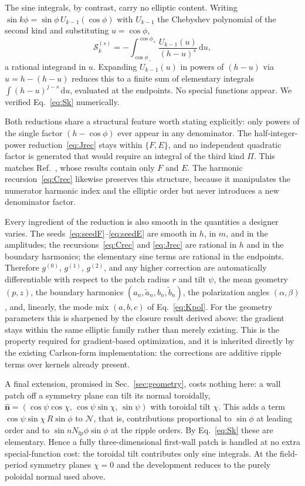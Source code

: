 \documentclass[11pt]{article}
\newcommand{\nhat}{\hat{\bm{n}}}
\newcommand{\Nfp}{N_{\mathrm{fp}}}
\newcommand{\dd}{\,\mathrm{d}}
\newcommand{\Sk}[2]{\mathcal{S}^{(#2)}_{#1}}
\begin{document}
The sine integrals, by contrast, carry no elliptic content. Writing $\sin k\phi=\sin\phi\,U_{k-1}(\cos\phi)$ with $U_{k-1}$ the Chebyshev polynomial of the second kind and substituting $u=\cos\phi$,
\begin{equation}
\Sk{k}{s}=-\int_{\cos\phi_-}^{\cos\phi_+}\frac{U_{k-1}(u)}{(h-u)^{s}}\dd u,
\label{eq:Sk}
\end{equation}
a rational integrand in $u$. Expanding $U_{k-1}(u)$ in powers of $(h-u)$ via $u=h-(h-u)$ reduces this to a finite sum of elementary integrals $\int (h-u)^{j-s}\dd u$, evaluated at the endpoints. No special functions appear. We verified Eq.~\eqref{eq:Sk} numerically.

Both reductions share a structural feature worth stating explicitly: only powers of the single factor $(h-\cos\phi)$ ever appear in any denominator. The half-integer-power reduction~\eqref{eq:Jrec} stays within $\{F,E\}$, and no independent quadratic factor is generated that would require an integral of the third kind $\Pi$. This matches Ref.~\cite{schwartz2025}, whose results contain only $F$ and $E$. The harmonic recursion~\eqref{eq:Crec} likewise preserves this structure, because it manipulates the numerator harmonic index and the elliptic order but never introduces a new denominator factor.

Every ingredient of the reduction is also smooth in the quantities a designer varies. The seeds~\eqref{eq:seedF}--\eqref{eq:seedE} are smooth in $h$, in $m$, and in the amplitudes; the recursions~\eqref{eq:Crec} and \eqref{eq:Jrec} are rational in $h$ and in the boundary harmonics; the elementary sine terms are rational in the endpoints. Therefore $g^{(0)}$, $g^{(1)}$, $g^{(2)}$, and any higher correction are automatically differentiable with respect to the patch radius $r$ and tilt $\psi$, the mean geometry $(p,z)$, the boundary harmonics $(a_n,\tilde a_n,b_n,\tilde b_n)$, the polarization angles $(\alpha,\beta)$, and, linearly, the mode mix $(a,b,c)$ of Eq.~\eqref{eq:Kpol}. For the geometry parameters this is sharpened by the closure result derived above: the gradient stays within the same elliptic family rather than merely existing. This is the property required for gradient-based optimization, and it is inherited directly by the existing Carlson-form implementation: the corrections are additive ripple terms over kernels already present.

A final extension, promised in Sec.~\ref{sec:geometry}, costs nothing here: a wall patch off a symmetry plane can tilt its normal toroidally, $\nhat=(\cos\psi\cos\chi,\,\cos\psi\sin\chi,\,\sin\psi)$ with toroidal tilt $\chi$. This adds a term $\cos\psi\sin\chi\,R\sin\phi$ to $\mathcal{N}$, that is, contributions proportional to $\sin\phi$ at leading order and to $\sin n\Nfp\phi\sin\phi$ at the ripple orders. By Eq.~\eqref{eq:Sk} these are elementary. Hence a fully three-dimensional first-wall patch is handled at no extra special-function cost: the toroidal tilt contributes only sine integrals. At the field-period symmetry planes $\chi=0$ and the development reduces to the purely poloidal normal used above.
\end{document}

